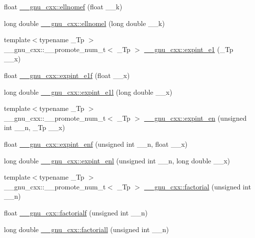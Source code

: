 \begin{DoxyCompactItemize}
float \hyperlink{group__gnu__math__spec__func_gad3ba08e5843ea0ec2bb9ddde3033adff}{\+\_\+\+\_\+gnu\+\_\+cxx\+::ellnomef} (float \+\_\+\+\_\+k)
\item 
long double \hyperlink{group__gnu__math__spec__func_ga0774570b24f654f8ae39e1865613a4e2}{\+\_\+\+\_\+gnu\+\_\+cxx\+::ellnomel} (long double \+\_\+\+\_\+k)
\item 
{\footnotesize template$<$typename \+\_\+\+Tp $>$ }\\\+\_\+\+\_\+gnu\+\_\+cxx\+::\+\_\+\+\_\+promote\+\_\+num\+\_\+t$<$ \+\_\+\+Tp $>$ \hyperlink{group__gnu__math__spec__func_ga3696fc269b543a908d47bad7e98256e7}{\+\_\+\+\_\+gnu\+\_\+cxx\+::expint\+\_\+e1} (\+\_\+\+Tp \+\_\+\+\_\+x)
\item 
float \hyperlink{group__gnu__math__spec__func_gad6d75fcefac4a20b52f29d9b1bc3a57d}{\+\_\+\+\_\+gnu\+\_\+cxx\+::expint\+\_\+e1f} (float \+\_\+\+\_\+x)
\item 
long double \hyperlink{group__gnu__math__spec__func_ga18cb55f0e83a9e369afaf5bae9e0772c}{\+\_\+\+\_\+gnu\+\_\+cxx\+::expint\+\_\+e1l} (long double \+\_\+\+\_\+x)
\item 
{\footnotesize template$<$typename \+\_\+\+Tp $>$ }\\\+\_\+\+\_\+gnu\+\_\+cxx\+::\+\_\+\+\_\+promote\+\_\+num\+\_\+t$<$ \+\_\+\+Tp $>$ \hyperlink{group__gnu__math__spec__func_ga46e6f84b809d0128b6596f0040927089}{\+\_\+\+\_\+gnu\+\_\+cxx\+::expint\+\_\+en} (unsigned int \+\_\+\+\_\+n, \+\_\+\+Tp \+\_\+\+\_\+x)
\item 
float \hyperlink{group__gnu__math__spec__func_gaf62278eb2899eaffab68a79dadb15612}{\+\_\+\+\_\+gnu\+\_\+cxx\+::expint\+\_\+enf} (unsigned int \+\_\+\+\_\+n, float \+\_\+\+\_\+x)
\item 
long double \hyperlink{group__gnu__math__spec__func_gaa3d0b9a177eb6666b6fbfa85d85650d0}{\+\_\+\+\_\+gnu\+\_\+cxx\+::expint\+\_\+enl} (unsigned int \+\_\+\+\_\+n, long double \+\_\+\+\_\+x)
\item 
{\footnotesize template$<$typename \+\_\+\+Tp $>$ }\\\+\_\+\+\_\+gnu\+\_\+cxx\+::\+\_\+\+\_\+promote\+\_\+num\+\_\+t$<$ \+\_\+\+Tp $>$ \hyperlink{group__gnu__math__spec__func_gafdb75898f433c95eec50d8effbf94fb4}{\+\_\+\+\_\+gnu\+\_\+cxx\+::factorial} (unsigned int \+\_\+\+\_\+n)
\item 
float \hyperlink{group__gnu__math__spec__func_ga5a288283a8ed63e1d2b0145f313a5378}{\+\_\+\+\_\+gnu\+\_\+cxx\+::factorialf} (unsigned int \+\_\+\+\_\+n)
\item 
long double \hyperlink{group__gnu__math__spec__func_ga0904e504fdc3c8b9b6f5c66a73531584}{\+\_\+\+\_\+gnu\+\_\+cxx\+::factoriall} (unsigned int \+\_\+\+\_\+n)

\end{DoxyCompactItemize}
